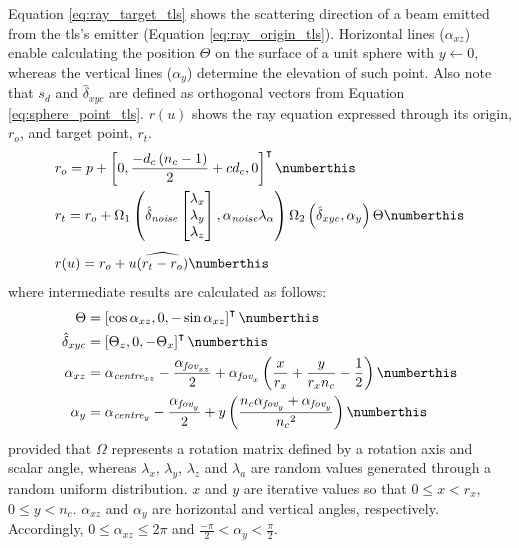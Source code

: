 Equation \ref{eq:ray_target_tls} shows the scattering direction of a beam emitted from the \acrshort{tls}'s emitter (Equation \ref{eq:ray_origin_tls}). Horizontal lines ($\alpha_{xz}$) enable calculating the position $\Theta$ on the surface of a unit sphere with $y \gets 0$, whereas the vertical lines ($\alpha_{y}$) determine the elevation of such point. Also note that $s_{d}$ and $\hat{\delta}_{xyc}$ are defined as orthogonal vectors from Equation \ref{eq:sphere_point_tls}. $r(u)$ shows the ray equation expressed through its origin, $r_{o}$, and target point, $r_{t}$. 
\begin{align*}
    &r_{o} = p + \left[0, \frac{-d_{c}\left(n_{c} - 1\right)}{2} + c d_{c}, 0\right]^\intercal 
    \numberthis \label{eq:ray_origin_tls}\\
    &r_{t} = r_{o} + \Omega_{1}\left(\hat{\delta}_{\textit{noise}}\begin{bmatrix}\lambda_{x} \\ \lambda_{y} \\ \lambda_{z} \end{bmatrix}, \alpha_{\textit{noise}}\lambda_{\alpha}\right) \Omega_{2}\left(\hat{\delta}_{xyc}, \alpha_{y}\right) \Theta
    \numberthis \label{eq:ray_target_tls}\\[.4em]
    &r(u) = r_o + u\widehat{\left(r_{t} - r_{o}\right)}
    \numberthis \label{eq:ray_equation_tls}
\end{align*}
where intermediate results are calculated as follows:
\begin{align*}
    \Theta &= \left[\cos{\alpha_{xz}}, 0, -\sin{\alpha_{xz}}\right]^\intercal 
    \numberthis \label{eq:sphere_point_tls}\\
    \hat{\delta}_{xyc} &= \left[\Theta_{z}, 0, -\Theta_{x}\right]^\intercal
    \numberthis \label{eq:sphere_angle_tls}\\
    \alpha_{xz} &= \alpha_{\textit{centre}_{xz}} - \frac{\alpha_{\textit{fov}_{xz}}}{2} + \alpha_{\textit{fov}_{x}}\left(\frac{x}{r_{x}} + \frac{y}{ r_{x}n_{c}} - \frac{1}{2}\right)
    \numberthis \label{eq:horizontal_angle_tls}\\
    \alpha_{y} &= \alpha_{\textit{centre}_{y}} - \frac{\alpha_{\textit{fov}_{y}}}{2} + y\left(\frac{n_{c}\alpha_{\textit{fov}_{y}} + \alpha_{\textit{fov}_{y}}}{{n_{c}}^2}\right)
    \numberthis \label{eq:vertical_angle_tls}
\end{align*}
provided that $\Omega$ represents a rotation matrix defined by a rotation axis and scalar angle, whereas $\lambda_{x}$, $\lambda_{y}$, $\lambda_{z}$ and $\lambda_{a}$ are random values generated through a random uniform distribution. $x$ and $y$ are iterative values so that $0 \leq x < r_{x}$, $0 \leq y < n_{c}$. $\alpha_{xz}$ and $\alpha_{y}$ are horizontal and vertical angles, respectively. Accordingly, $0 \leq \alpha_{xz} \leq 2\pi$ and $\frac{-\pi}{2} < \alpha_{y} < \frac{\pi}{2}$. 

